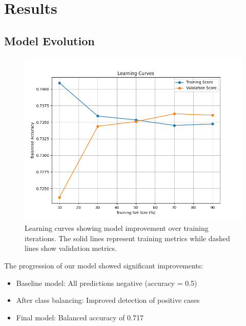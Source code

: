 \documentclass[10pt,conference,compsocconf]{IEEEtran}
\begin{document}
\section{Results}

\subsection{Model Evolution}
\begin{figure}[H]
    \centering
    \includegraphics[width=0.95\columnwidth]{figures/learning_curves.png}
    \caption{Learning curves showing model improvement over training iterations.
    The solid lines represent training metrics while dashed lines show validation metrics.}
    \label{fig:learning}
\end{figure}

The progression of our model showed significant improvements:
\begin{itemize}
    \item Baseline model: All predictions negative (accuracy = 0.5)
    \item After class balancing: Improved detection of positive cases
    \item Final model: Balanced accuracy of 0.717
\end{itemize}
\end{document}
